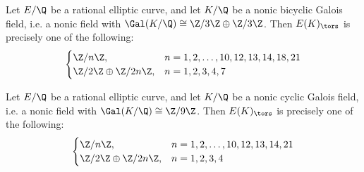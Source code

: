 \begin{frame}[plain,c]
\begin{thm}[M.]
Let $E/\Q$ be a rational elliptic curve, and let $K/\Q$ be a nonic bicyclic Galois field, i.e. a nonic field with $\Gal(K/\Q) \cong \Z/3\Z \oplus \Z/3\Z$. Then $E(K)_\tors$ is precisely one of the following:
	\[
	\begin{cases}
	\Z/n\Z, & n= 1, 2, \ldots, 10, 12, 13, 14, 18, 21 \\
	\Z/2\Z \oplus \Z/2n\Z, & n= 1, 2, 3, 4, 7
	\end{cases}
	\]
\end{thm}
\begin{thm}[M.]
Let $E/\Q$ be a rational elliptic curve, and let $K/\Q$ be a nonic cyclic Galois field, i.e. a nonic field with $\Gal(K/\Q) \cong \Z/9\Z$. Then $E(K)_\tors$ is precisely one of the following:
	\[
	\begin{cases}
	\Z/n\Z, & n= 1, 2, \ldots, 10, 12, 13, 14, 21 \\
	\Z/2\Z \oplus \Z/2n\Z, & n= 1, 2, 3, 4
	\end{cases}
	\]
\end{thm}
\end{frame}





